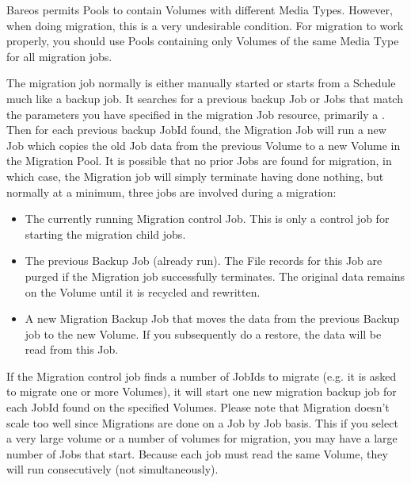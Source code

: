 Bareos permits Pools to contain Volumes with different Media Types.
However, when doing migration, this is a very undesirable condition.  For
migration to work properly, you should use Pools containing only Volumes of
the same Media Type for all migration jobs.

The migration job normally is either manually started or starts
from a Schedule much like a backup job. It searches
for a previous backup Job or Jobs that match the parameters you have
specified in the migration Job resource, primarily a 
.  
Then for
each previous backup JobId found, the Migration Job will run a new Job which
copies the old Job data from the previous Volume to a new Volume in
the Migration Pool.  It is possible that no prior Jobs are found for
migration, in which case, the Migration job will simply terminate having
done nothing, but normally at a minimum, three jobs are involved during a
migration:

\begin{itemize}
\item The currently running Migration control Job. This is only
      a control job for starting the migration child jobs.
\item The previous Backup Job (already run). The File records
      for this Job are purged if the Migration job successfully
      terminates.  The original data remains on the Volume until
      it is recycled and rewritten.
\item A new Migration Backup Job that moves the data from the
      previous Backup job to the new Volume.  If you subsequently
      do a restore, the data will be read from this Job.
\end{itemize}

If the Migration control job finds a number of JobIds to migrate (e.g.
it is asked to migrate one or more Volumes), it will start one new
migration backup job for each JobId found on the specified Volumes.
Please note that Migration doesn't scale too well since Migrations are
done on a Job by Job basis. This if you select a very large volume or
a number of volumes for migration, you may have a large number of
Jobs that start. Because each job must read the same Volume, they will
run consecutively (not simultaneously).



